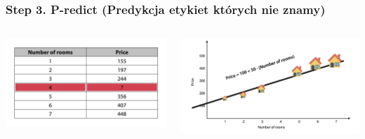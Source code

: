 \documentclass[smaller]{beamer}
\begin{document}
\begin{frame}
\frametitle{Step 3. P-redict (Predykcja etykiet których nie znamy)}

\begin{columns}
    \begin{column}{0.5\textwidth}
        \includegraphics[width=\linewidth]{../manifest/estate-data.png} 
        \centering
    \end{column}
    \begin{column}{0.5\textwidth}
        \includegraphics[width=\linewidth]{../manifest/estate-formulate}
        \centering
    \end{column}
\end{columns}

\end{frame}

\end{document}
